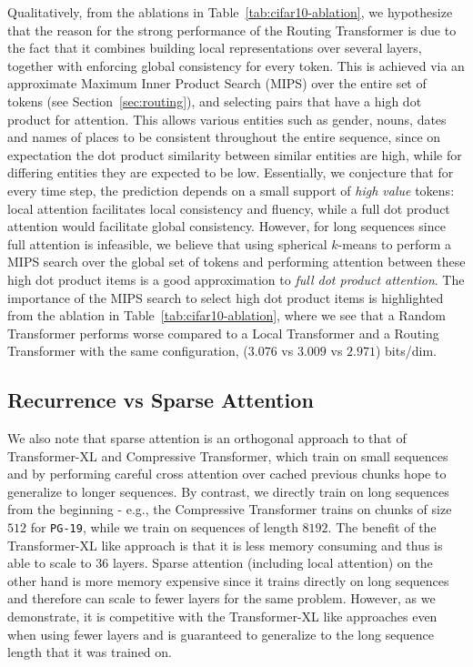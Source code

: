 \documentclass[a4paper]{article}
\begin{document}
Qualitatively, from the ablations in Table~\ref{tab:cifar10-ablation},
we hypothesize that the reason for the strong performance of the Routing Transformer
is due to the fact that it combines building local representations over several
layers, together with enforcing global consistency for every token. This is achieved
via an approximate Maximum Inner Product Search (MIPS) over the entire set of tokens
(see Section~\ref{sec:routing}),
and selecting pairs that have a high dot product for attention.
This allows various entities such as gender, nouns, dates and 
names of places to be consistent throughout the entire sequence, 
since on expectation the dot product similarity
between similar entities are high, while for differing entities they are expected to be low. 
Essentially, we conjecture that for every time step, the prediction depends on a small 
support of \emph{high value} tokens:
local attention facilitates local consistency and fluency, while a full dot product attention
would facilitate global consistency. However, for long sequences since full attention is 
infeasible, we believe that using spherical \(k\)-means to perform a MIPS search over the 
global set of tokens and performing attention between these high dot product items
is a good approximation to \emph{full dot product attention}. The importance of the MIPS
search to select high dot product items is highlighted from the ablation in 
Table~\ref{tab:cifar10-ablation}, where we see that a Random Transformer 
performs worse compared to a Local Transformer and a Routing Transformer
with the same configuration, (\(3.076\) vs \(3.009\) vs \(2.971\)) bits/dim.

\subsection{Recurrence vs Sparse Attention}
We also note that sparse attention is an orthogonal approach to that of Transformer-XL and 
Compressive Transformer,
which train on small sequences and by performing careful cross attention over cached previous chunks hope to generalize to longer sequences. By contrast, we directly train on long sequences from the beginning - 
e.g., the Compressive Transformer trains on chunks of size \(512\) for \texttt{PG-19}, while 
we train on sequences of length \(8192\). 
The benefit of the Transformer-XL like approach is that it is less memory consuming
and thus is able to scale to \(36\) layers. 
Sparse attention (including local attention) on the other hand is more memory 
expensive since it trains directly on long sequences and therefore
can scale to fewer layers for the same problem. However, as we demonstrate, it is competitive
with the Transformer-XL like approaches even when using fewer layers and is guaranteed to generalize to the long 
sequence length that it was trained on.
\end{document}
